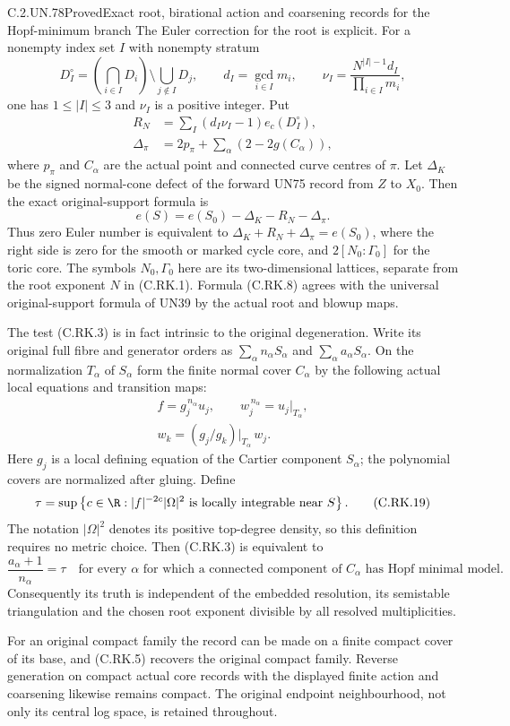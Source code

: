 \begin{statement}{C.2.UN.78}{Proved}{Exact root, birational action and coarsening records for the Hopf-minimum branch}
The Euler correction for the root is explicit.
For a nonempty index set $I$ with nonempty stratum
\[
 D_I^\circ=
    \left(\bigcap_{i\in I}D_i\right)
           \setminus\bigcup_{j\notin I}D_j,
 \qquad d_I=\gcd_{i\in I}m_i,
 \qquad \nu_I=\frac{N^{|I|-1}d_I}{\prod_{i\in I}m_i},
\tag{C.RK.6}
\]
one has $1\le|I|\le3$ and $\nu_I$ is a positive
integer. Put
\[
 \begin{split}
 R_N&=\sum_I(d_I\nu_I-1)e_c(D_I^\circ),\\
 \Delta_\pi&=2p_\pi+
                   \sum_\alpha(2-2g(C_\alpha)),
 \end{split}
\tag{C.RK.7}
\]
where $p_\pi$ and $C_\alpha$ are the actual point
and connected curve centres of $\pi$. Let
$\Delta_K$ be the signed normal-cone defect of
the forward UN75 record from $Z$ to $X_0$.
Then the exact original-support formula is
\[
                e(S)=e(S_0)-\Delta_K-R_N-\Delta_\pi.
\tag{C.RK.8}
\]
Thus zero Euler number is equivalent to
$\Delta_K+R_N+\Delta_\pi=e(S_0)$, where the
right side is zero for the smooth or marked
cycle core, and $2[N_0:\Gamma_0]$ for the
toric core. The symbols $N_0,\Gamma_0$ here
are its two-dimensional lattices, separate
from the root exponent $N$ in (C.RK.1).
Formula (C.RK.8) agrees with the universal
original-support formula of UN39 by the
actual root and blowup maps.

The test (C.RK.3) is in fact intrinsic to
the original degeneration. Write its original
full fibre and generator orders as
$\sum_\alpha n_\alpha S_\alpha$ and
$\sum_\alpha a_\alpha S_\alpha$.
On the normalization $T_\alpha$ of $S_\alpha$
form the finite normal cover $C_\alpha$
by the following actual local equations
and transition maps:
\[
 \begin{gathered}
 f=g_j^{\,n_\alpha}u_j,\qquad
 w_j^{\,n_\alpha}=u_j|_{T_\alpha},\\
 w_k=(g_j/g_k)|_{T_\alpha}\,w_j .
 \end{gathered}
\tag{C.RK.18}
\]
Here $g_j$ is a local defining equation
of the Cartier component $S_\alpha$;
the polynomial covers are normalized
after gluing. Define
\[
 \tau=\sup\left\{c\in\R:
       |f|^{-2c}|\Omega|^2\text{ is locally integrable
                              near }S\right\}.
\tag{C.RK.19}
\]
The notation $|\Omega|^2$ denotes its
positive top-degree density, so this
definition requires no metric choice.
Then (C.RK.3) is equivalent to
\[
 \frac{a_\alpha+1}{n_\alpha}=\tau
 \quad\text{for every }\alpha\text{ for which a connected
 component of }C_\alpha\text{ has Hopf minimal model}.
\tag{C.RK.20}
\]
Consequently its truth is independent
of the embedded resolution, its
semistable triangulation and the
chosen root exponent divisible by
all resolved multiplicities.

For an original compact family the record can
be made on a finite compact cover of its base,
and (C.RK.5) recovers the original compact
family. Reverse generation on compact actual
core records with the displayed finite action
and coarsening likewise remains compact.
The original endpoint neighbourhood, not only
its central log space, is retained throughout.
\end{statement}

